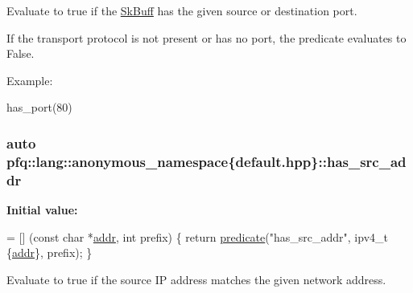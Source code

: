 Evaluate to {\ttfamily true} if the \hyperlink{structpfq_1_1lang_1_1SkBuff}{Sk\+Buff} has the given source or destination port. 

If the transport protocol is not present or has no port, the predicate evaluates to False.

Example\+:

has\+\_\+port(80) 
\subsubsection[{\texorpdfstring{has\+\_\+src\+\_\+addr}{has_src_addr}}]{\setlength{\rightskip}{0pt plus 5cm}auto pfq\+::lang\+::anonymous\+\_\+namespace\{default.\+hpp\}\+::has\+\_\+src\+\_\+addr}\hypertarget{namespacepfq_1_1lang_1_1anonymous__namespace_02default_8hpp_03_acb03dd3e34d6dd7e83d621fa9077194c}{}\label{namespacepfq_1_1lang_1_1anonymous__namespace_02default_8hpp_03_acb03dd3e34d6dd7e83d621fa9077194c}
{\bfseries Initial value\+:}
\begin{DoxyCode}
= [] (\textcolor{keyword}{const} \textcolor{keywordtype}{char} *\hyperlink{namespacepfq_1_1lang_1_1anonymous__namespace_02default_8hpp_03_a13cabe468839119d8d68540e3c60718b}{addr}, \textcolor{keywordtype}{int} prefix)
        \{
            \textcolor{keywordflow}{return} \hyperlink{namespacepfq_1_1lang_aca9adafc436b7f851621b979fa1aaf88}{predicate}(\textcolor{stringliteral}{"has\_src\_addr"}, ipv4\_t \{\hyperlink{namespacepfq_1_1lang_1_1anonymous__namespace_02default_8hpp_03_a13cabe468839119d8d68540e3c60718b}{addr}\}, prefix);
        \}
\end{DoxyCode}


Evaluate to {\ttfamily true} if the source IP address matches the given network address. 


